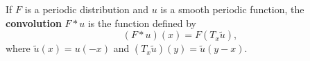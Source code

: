 If $F$ is a periodic distribution and $u$ is a smooth periodic function, the \textbf{convolution} $F * u$ is the function defined by
$$(F * u)(x) = F(T_x \tilde{u}),$$
where $\tilde{u}(x) = u(-x)$ and $(T_x \tilde{u})(y) = \tilde{u}(y - x)$.
